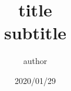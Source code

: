 \documentclass{jsarticle}
\begin{document}
\begin{titlepage}
    \title{title \\subtitle}
    \date{2020/01/29}
    \author{author}
    \maketitle
\end{titlepage}

\section{}
\subsection{}
\end{document}
